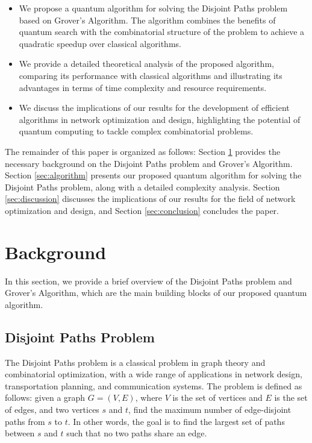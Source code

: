 \begin{itemize}
\item We propose a quantum algorithm for solving the Disjoint Paths problem based on Grover's Algorithm. The algorithm combines the benefits of quantum search with the combinatorial structure of the problem to achieve a quadratic speedup over classical algorithms.

\item We provide a detailed theoretical analysis of the proposed algorithm, comparing its performance with classical algorithms and illustrating its advantages in terms of time complexity and resource requirements.

\item We discuss the implications of our results for the development of efficient algorithms in network optimization and design, highlighting the potential of quantum computing to tackle complex combinatorial problems.
\end{itemize}

The remainder of this paper is organized as follows: Section \ref{sec:background} provides the necessary background on the Disjoint Paths problem and Grover's Algorithm. Section \ref{sec:algorithm} presents our proposed quantum algorithm for solving the Disjoint Paths problem, along with a detailed complexity analysis. Section \ref{sec:discussion} discusses the implications of our results for the field of network optimization and design, and Section \ref{sec:conclusion} concludes the paper.

\section{Background}
\label{sec:background}
In this section, we provide a brief overview of the Disjoint Paths problem and Grover's Algorithm, which are the main building blocks of our proposed quantum algorithm.

\subsection{Disjoint Paths Problem}
The Disjoint Paths problem is a classical problem in graph theory and combinatorial optimization, with a wide range of applications in network design, transportation planning, and communication systems. The problem is defined as follows: given a graph $G=(V, E)$, where $V$ is the set of vertices and $E$ is the set of edges, and two vertices $s$ and $t$, find the maximum number of edge-disjoint paths from $s$ to $t$. In other words, the goal is to find the largest set of paths between $s$ and $t$ such that no two paths share an edge.

